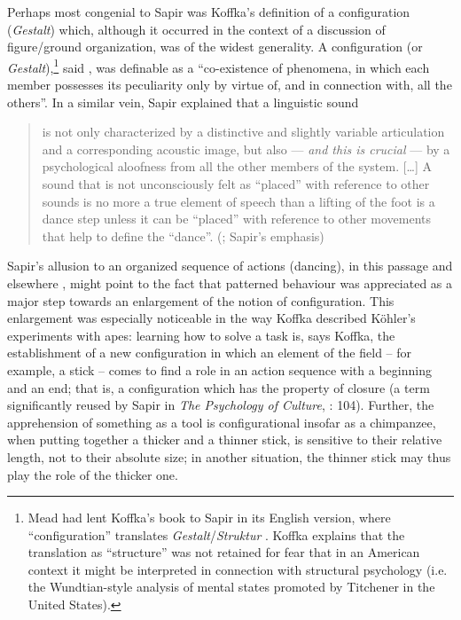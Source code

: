 \documentclass[output=paper]{langscibook}
\begin{document}
Perhaps most congenial to Sapir was Koffka's definition of a configuration (\emph{Ge\-stalt}) which, although it occurred in the context of a discussion of figure/ground organization, was of the widest generality. A configuration (or \emph{Gestalt}),\footnote{Mead had lent Koffka's book to Sapir in its English version, where ``configuration'' translates \emph{Gestalt}/\emph{Struktur} \citep[185]{Darnell1990}. Koffka explains that the translation as ``structure'' was not retained for fear that in an American context it might be interpreted in connection with structural psychology (i.e. the Wundtian-style analysis of mental states promoted by Titchener in the United States).} said \citet[146]{Koffka1924}, was definable as a ``co-existence of phenomena, in which each member possesses its peculiarity only by virtue of, and in connection with, all the others''. In a similar vein, Sapir explained that a linguistic sound 

\begin{quotation}
is not only characterized by a distinctive and slightly variable articulation and a corresponding acoustic image, but also — \emph{and this is crucial} — by a psychological aloofness from all the other members of the system. […] A sound that is not unconsciously felt as ``placed'' with reference to other sounds is no more a true element of speech than a lifting of the foot is a dance step unless it can be ``placed'' with reference to other movements that help to define the ``dance''. (\citealt[35]{Sapir1925}; Sapir's emphasis)
\end{quotation}

Sapir's allusion to an organized sequence of actions (dancing), in this passage and elsewhere \citep[104--105]{Sapir2002}, might point to the fact that patterned behaviour was appreciated as a major step towards an enlargement of the notion of configuration. This enlargement was especially noticeable in the way Koffka described Köhler's experiments with apes: learning how to solve a task is, says Koffka, the establishment of a new configuration in which an element of the field -- for example, a stick -- comes to find a role in an action sequence with a beginning and an end; that is, a configuration which has the property of closure (a term significantly reused by Sapir in \emph{The Psychology of Culture}, \citeyear{Sapir2002}: 104). Further, the apprehension of something as a tool is configurational insofar as a chimpanzee, when putting together a thicker and a thinner stick, is sensitive to their relative length, not to their absolute size; in another situation, the thinner stick may thus play the role of the thicker one.
\end{document}
